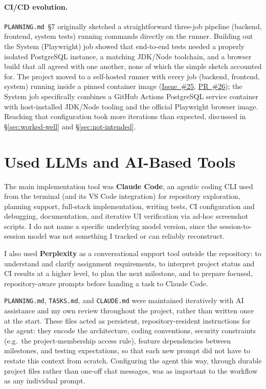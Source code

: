\documentclass[11pt,a4paper]{article}
\newcommand{\repourl}{https://github.com/se2p-classrooms/final-project-ayoubalila}
\newcommand{\ghissue}[1]{\href{\repourl/issues/#1}{Issue~\##1}}
\newcommand{\ghpr}[1]{\href{\repourl/pull/#1}{PR~\##1}}
\begin{document}
\paragraph{CI/CD evolution.} \texttt{PLANNING.md}~\S7 originally sketched a straightforward three-job pipeline (backend, frontend, system tests) running commands directly on the runner. Building out the System (Playwright) job showed that end-to-end tests needed a properly isolated PostgreSQL instance, a matching JDK/Node toolchain, and a browser build that all agreed with one another, none of which the simple sketch accounted for. The project moved to a self-hosted runner with every job (backend, frontend, system) running inside a pinned container image (\ghissue{25}, \ghpr{26}); the System job specifically combines a GitHub Actions PostgreSQL service container with host-installed JDK/Node tooling and the official Playwright browser image. Reaching that configuration took more iterations than expected, discussed in \S\ref{sec:worked-well} and \S\ref{sec:not-intended}.

\section{Used LLMs and AI-Based Tools}

The main implementation tool was \textbf{Claude Code}, an agentic coding CLI used from the terminal (and its VS Code integration) for repository exploration, planning support, full-stack implementation, writing tests, CI configuration and debugging, documentation, and iterative UI verification via ad-hoc screenshot scripts. I do not name a specific underlying model version, since the session-to-session model was not something I tracked or can reliably reconstruct.

I also used \textbf{Perplexity} as a conversational support tool outside the repository: to understand and clarify assignment requirements, to interpret project status and CI results at a higher level, to plan the next milestone, and to prepare focused, repository-aware prompts before handing a task to Claude Code.

\texttt{PLANNING.md}, \texttt{TASKS.md}, and \texttt{CLAUDE.md} were maintained iteratively with AI assistance and my own review throughout the project, rather than written once at the start. These files acted as persistent, repository-resident instructions for the agent: they encode the architecture, coding conventions, security constraints (e.g.\ the project-membership access rule), feature dependencies between milestones, and testing expectations, so that each new prompt did not have to restate this context from scratch. Configuring the agent this way, through durable project files rather than one-off chat messages, was as important to the workflow as any individual prompt.
\end{document}
